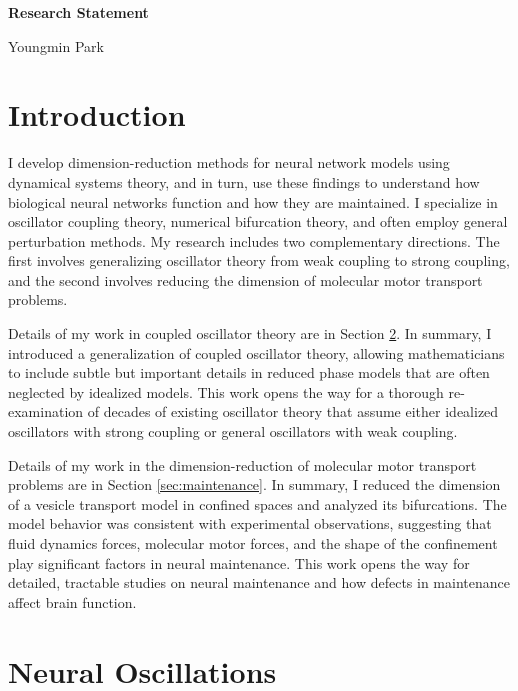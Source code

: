 \documentclass[a4paper,11pt]{article}
\begin{document}
\begin{center}
\Large \textbf{Research Statement}

\Large Youngmin Park
\end{center}


\section{Introduction}

I develop dimension-reduction methods for neural network models using dynamical systems theory, and in turn, use these findings to understand how biological neural networks function and how they are maintained. I specialize in  oscillator coupling theory, numerical bifurcation theory, and often employ general perturbation methods. My research includes two complementary directions. The first involves generalizing oscillator theory from weak coupling to strong coupling, and the second involves reducing the dimension of molecular motor transport problems.

Details of my work in coupled oscillator theory are in Section \ref{sec:interactions}. In summary, I introduced a generalization of coupled oscillator theory, allowing mathematicians to include subtle but important details in reduced phase models that are often neglected by idealized models. This work opens the way for a thorough re-examination of decades of existing oscillator theory that assume either idealized oscillators with strong coupling or general oscillators with weak coupling.

Details of my work in the dimension-reduction of molecular motor transport problems are in Section \ref{sec:maintenance}. In summary, I reduced the dimension of a vesicle transport model in confined spaces and analyzed its bifurcations. The model behavior was consistent with experimental observations, suggesting that fluid dynamics forces, molecular motor forces, and the shape of the confinement play significant factors in neural maintenance. This work opens the way for detailed, tractable studies on neural maintenance and how defects in maintenance affect brain function.


\section{Neural Oscillations}\label{sec:interactions}

\end{document}
